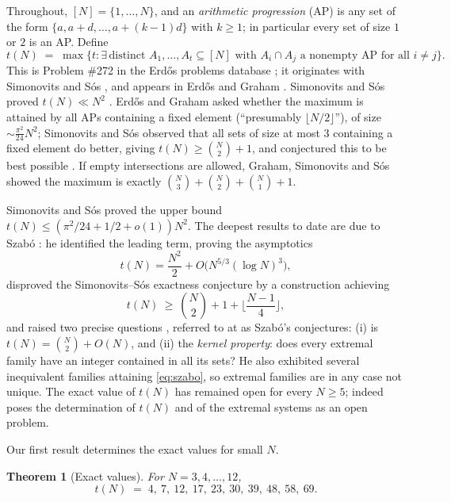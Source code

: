 \documentclass[11pt]{article}
\newtheorem{theorem}{Theorem}[section]
\theoremstyle{definition}
\begin{document}
Throughout, $[N]=\{1,\dots,N\}$, and an \emph{arithmetic progression} (AP) is any set of the form $\{a, a+d, \dots, a+(k-1)d\}$ with $k\ge 1$; in particular every set of size $1$ or $2$ is an AP. Define
\[
 t(N) \;=\; \max\Big\{ t : \exists\, \text{distinct } A_1,\dots,A_t\subseteq [N] \text{ with } A_i\cap A_j \text{ a nonempty AP for all } i\ne j \Big\}.
\]
This is Problem \#272 in the Erd\H{o}s problems database \cite{EP272}; it originates with Simonovits and S\'os \cite{SiSo81}, and appears in Erd\H{o}s and Graham \cite{ErGr80}. Simonovits and S\'os proved $t(N)\ll N^2$ \cite{SiSo81}. Erd\H{o}s and Graham asked whether the maximum is attained by all APs containing a fixed element (``presumably $\lfloor N/2\rfloor$''), of size $\sim\frac{\pi^2}{24}N^2$; Simonovits and S\'os observed that all sets of size at most $3$ containing a fixed element do better, giving $t(N)\ge\binom N2+1$, and conjectured this to be best possible \cite{SiSo81,EP272}. If empty intersections are allowed, Graham, Simonovits and S\'os \cite{GSS80} showed the maximum is exactly $\binom N3+\binom N2+\binom N1+1$.

Simonovits and S\'os \cite{SiSo81} proved the upper bound $t(N)\le(\pi^2/24+1/2+o(1))N^2$. The deepest results to date are due to Szab\'o \cite{Sz99}: he identified the leading term, proving the asymptotics
\[ t(N) = \frac{N^2}{2} + O\big(N^{5/3}(\log N)^3\big), \]
disproved the Simonovits--S\'os exactness conjecture by a construction achieving
\begin{equation}\label{eq:szabo}
 t(N)\ \ge\ \binom N2+1+\Big\lfloor\frac{N-1}{4}\Big\rfloor,
\end{equation}
and raised two precise questions \cite[\S6]{Sz99}, referred to at \cite{EP272} as Szab\'o's conjectures: (i) is $t(N)=\binom N2+O(N)$, and (ii) the \emph{kernel property}: does every extremal family have an integer contained in all its sets? He also exhibited several inequivalent families attaining \eqref{eq:szabo}, so extremal families are in any case not unique. The exact value of $t(N)$ has remained open for every $N\ge 5$; indeed \cite[\S6]{Sz99} poses the determination of $t(N)$ and of the extremal systems as an open problem.

Our first result determines the exact values for small $N$.

\begin{theorem}[Exact values]\label{thm:exact}
For $N=3,4,\dots,12$,
\[ t(N) \;=\; 4,\ 7,\ 12,\ 17,\ 23,\ 30,\ 39,\ 48,\ 58,\ 69. \]
\end{theorem}
\end{document}
